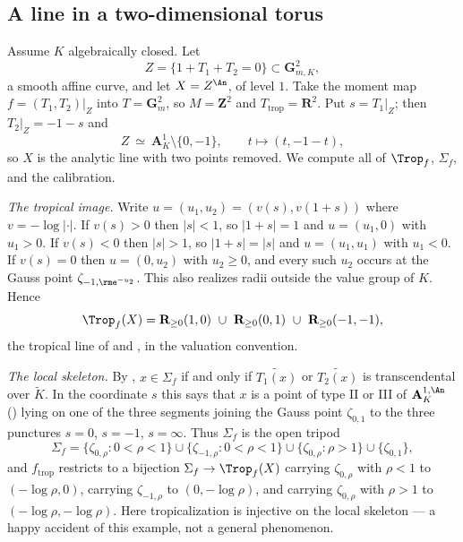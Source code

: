 \subsection{A line in a two-dimensional torus}

\begin{example}
\label{ex:trop-line-in-torus}
Assume $K$ algebraically closed. Let
\[
 Z=\{1+T_1+T_2=0\}\subset\mathbf G_{m,K}^2,
\]
a smooth affine curve, and let $X=Z^{\An}$, of level $1$. Take the moment
map $f=(T_1,T_2)|_Z$ into $T=\mathbf G_m^2$, so $M=\mathbf Z^2$ and
$T_{\mathrm{trop}}=\mathbf R^2$. Put $s=T_1|_Z$; then $T_2|_Z=-1-s$ and
\[
 Z\ \simeq\ \mathbf A^1_K\setminus\{0,-1\},
 \qquad t\longmapsto(t,-1-t),
\]
so $X$ is the analytic line with two points removed. We compute all of
$\Trop_f$, $\Sigma_f$, and the calibration.

\emph{The tropical image.} Write $u=(u_1,u_2)=(v(s),v(1+s))$ where
$v=-\log|\cdot|$. If $v(s)>0$ then $|s|<1$, so $|1+s|=1$ and $u=(u_1,0)$ with
$u_1>0$. If $v(s)<0$ then $|s|>1$, so $|1+s|=|s|$ and $u=(u_1,u_1)$ with
$u_1<0$. If $v(s)=0$ then $u=(0,u_2)$ with $u_2\ge0$, and every such $u_2$
occurs at the Gauss point $\zeta_{-1,\rme^{-u_2}}$. This also realizes
radii outside the value group of $K$. Hence
\[
 \Trop_f(X)=\mathbf R_{\ge0}(1,0)\ \cup\ \mathbf R_{\ge0}(0,1)
 \ \cup\ \mathbf R_{\ge0}(-1,-1),
\]
the tropical line of  and
, in the valuation convention.

\emph{The local skeleton.} By ,
$x\in\Sigma_f$ if and only if $\widetilde{T_1(x)}$ or $\widetilde{T_2(x)}$ is
transcendental over $\widetilde K$. In the coordinate $s$ this says that $x$
is a point of type II or III of $\mathbf A^{1,\An}_K$
() lying on one of the three segments
joining the Gauss point $\zeta_{0,1}$ to the three punctures
$s=0$, $s=-1$, $s=\infty$. Thus $\Sigma_f$ is the open tripod
\[
 \Sigma_f=\{\zeta_{0,\rho}:0<\rho<1\}\cup\{\zeta_{-1,\rho}:0<\rho<1\}
 \cup\{\zeta_{0,\rho}:\rho>1\}\cup\{\zeta_{0,1}\},
\]
and $f_{\mathrm{trop}}$ restricts to a bijection $\Sigma_f\to\Trop_f(X)$
carrying $\zeta_{0,\rho}$ with $\rho<1$ to $(-\log\rho,0)$, carrying
$\zeta_{-1,\rho}$ to $(0,-\log\rho)$, and carrying $\zeta_{0,\rho}$ with
$\rho>1$ to $(-\log\rho,-\log\rho)$. Here tropicalization is injective on
the local skeleton --- a happy accident of this example, not a general
phenomenon.


\end{example}
